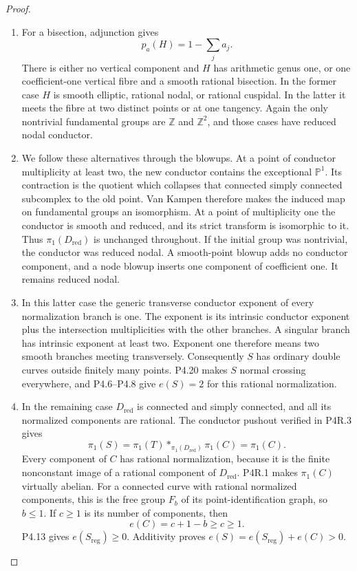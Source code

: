 \begin{proof}
\begin{enumerate}[label={$\langle1\rangle$\arabic*.},leftmargin=*]
\item For a bisection, adjunction gives
\[
 p_a(H)=1-\sum_j a_j.
\]
There is either no vertical component and $H$ has
arithmetic genus one, or one coefficient-one vertical
fibre and a smooth rational bisection. In the former
case $H$ is smooth elliptic, rational nodal, or rational
cuspidal. In the latter it meets the fibre at two distinct
points or at one tangency. Again the only nontrivial
fundamental groups are $\mathbb Z$ and $\mathbb Z^2$,
and those cases have reduced nodal conductor.

\item We follow these alternatives through the blowups. At a
point of conductor multiplicity at least two, the new
conductor contains the exceptional $\mathbb P^1$.
Its contraction is the quotient which collapses that
connected simply connected subcomplex to the old
point. Van Kampen therefore makes the induced map on
fundamental groups an isomorphism. At a point of
multiplicity one the conductor is smooth and reduced,
and its strict transform is isomorphic to it. Thus
$\pi_1(D_{\mathrm{red}})$ is unchanged throughout.
If the initial group was nontrivial, the conductor was
reduced nodal. A smooth-point blowup adds no conductor
component, and a node blowup inserts one component of
coefficient one. It remains reduced nodal.

\item In this latter case the generic transverse conductor
exponent of every normalization branch is one. The
exponent is its intrinsic conductor exponent plus the
intersection multiplicities with the other branches.
A singular branch has intrinsic exponent at least two.
Exponent one therefore means two smooth branches
meeting transversely. Consequently $S$ has ordinary
double curves outside finitely many points. P4.20 makes
$S$ normal crossing everywhere, and P4.6--P4.8 give
$e(S)=2$ for this rational normalization.

\item In the remaining case $D_{\mathrm{red}}$ is connected
and simply connected, and all its normalized components
are rational. The conductor pushout verified in P4R.3
gives
\[
 \pi_1(S)=\pi_1(T)*_{\pi_1(D_{\mathrm{red}})}\pi_1(C)
          =\pi_1(C).
\]
Every component of $C$ has rational normalization,
because it is the finite nonconstant image of a
rational component of $D_{\mathrm{red}}$. P4R.1 makes
$\pi_1(C)$ virtually abelian. For a connected curve
with rational normalized components, this is the free
group $F_b$ of its point-identification graph, so
$b\le1$. If $c\ge1$ is its number of components, then
\[
 e(C)=c+1-b\ge c\ge1.
\]
P4.13 gives $e(S_{\mathrm{reg}})\ge0$. Additivity proves
$e(S)=e(S_{\mathrm{reg}})+e(C)>0$.

\end{enumerate}
\end{proof}
